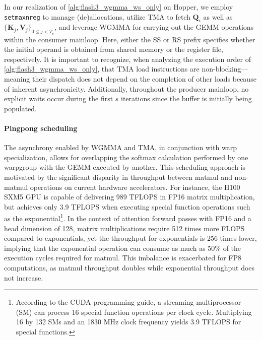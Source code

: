 In our realization of \cref{alg:flash3_wgmma_ws_only} on Hopper, we employ \verb|setmaxnreg| to manage (de)allocations, utilize TMA to fetch $\mathbf{Q}_i$ as well as $\{ \mathbf{K}_j, \mathbf{V}_j \}_{0 \leq j < T_c}$, and leverage WGMMA for carrying out the GEMM operations within the consumer mainloop. Here, either the SS or RS prefix specifies whether the initial operand is obtained from shared memory or the register file, respectively. It is important to recognize, when analyzing the execution order of \cref{alg:flash3_wgmma_ws_only}, that TMA load instructions are non-blocking—meaning their dispatch does not depend on the completion of other loads because of inherent asynchronicity. Additionally, throughout the producer mainloop, no explicit waits occur during the first $s$ iterations since the buffer is initially being populated.

\paragraph{Pingpong scheduling} The asynchrony enabled by WGMMA and TMA, in conjunction with warp specialization, allows for overlapping the softmax calculation performed by one warpgroup with the GEMM executed by another. This scheduling approach is motivated by the significant disparity in throughput between matmul and non-matmul operations on current hardware accelerators. For instance, the H100 SXM5 GPU is capable of delivering 989 TFLOPS in FP16 matrix multiplication, but achieves only 3.9 TFLOPS when executing special function operations such as the exponential\footnote{According to the CUDA programming guide, a streaming multiprocessor (SM) can process 16 special function operations per clock cycle. Multiplying 16 by 132 SMs and an 1830 MHz clock frequency yields 3.9 TFLOPS for special functions.}. In the context of attention forward passes with FP16 and a head dimension of 128, matrix multiplications require 512 times more FLOPS compared to exponentials, yet the throughput for exponentials is 256 times lower, implying that the exponential operation can consume as much as 50\% of the execution cycles required for matmul. This imbalance is exacerbated for FP8 computations, as matmul throughput doubles while exponential throughput does not increase.

